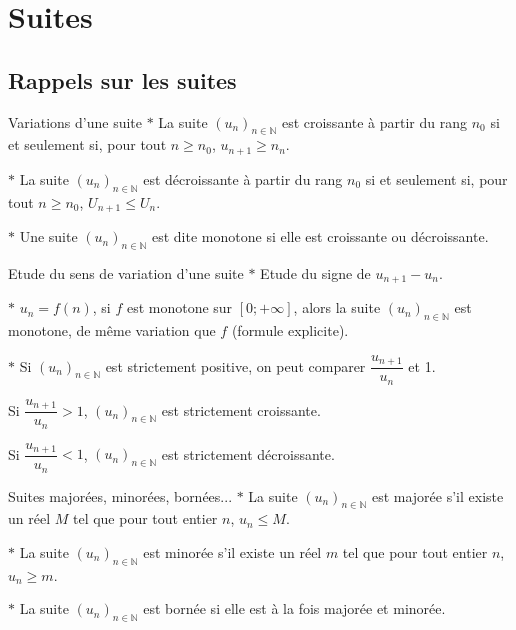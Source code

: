 \section{Suites}
\subsection{Rappels sur les suites}

\begin{bclogo}{Variations d'une suite}
$\ast$ La suite $(u_n)_{n\in\mathbb{N}}$ est croissante à partir du rang $n_0$ si et seulement si, pour tout $n\geqslant n_0$, $u_{n+1}\geqslant n_n$.

\noindent
$\ast$ La suite $(u_n)_{n\in\mathbb{N}}$ est décroissante à partir du rang $n_0$ si et seulement si, pour tout $n\geqslant n_0$, $U_{n+1}\leqslant U_n$.

\noindent
$\ast$ Une suite $(u_n)_{n\in\mathbb{N}}$ est dite monotone si elle est croissante ou décroissante.
\end{bclogo}

\medskip

\begin{bclogo}{Etude du sens de variation d'une suite}
$\ast$ Etude du signe de $u_{n+1}-u_n$.

\noindent
$\ast$ $u_n=f(n)$, si $f$ est monotone sur $\left[ 0;+\infty \right]$, alors la suite $(u_n)_{n\in\mathbb{N}}$ est monotone, de même variation que $f$ (formule explicite).

\noindent
$\ast$ Si $(u_n)_{n\in\mathbb{N}}$ est strictement positive, on peut comparer $\dfrac{u_{n+1}}{u_n}$ et 1. 

Si $\dfrac{u_{n+1}}{u_n}>1$, $(u_n)_{n\in\mathbb{N}}$ est strictement croissante.

Si $\dfrac{u_{n+1}}{u_n}<1$, $(u_n)_{n\in\mathbb{N}}$ est strictement décroissante.
\end{bclogo}

\medskip

\begin{bclogo}{Suites majorées, minorées, bornées...}
$\ast$ La suite $(u_n)_{n\in\mathbb{N}}$ est majorée s'il existe un réel $M$ tel que pour tout entier $n$, $u_n\leqslant M$.

\noindent 
$\ast$ La suite $(u_n)_{n\in\mathbb{N}}$ est minorée s'il existe un réel $m$ tel que pour tout entier $n$, $u_n\geqslant m$.

\noindent 
$\ast$ La suite $(u_n)_{n\in\mathbb{N}}$ est bornée si elle est à la fois majorée et minorée. 
\end{bclogo}



